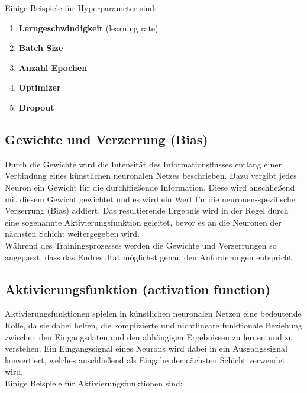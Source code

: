 Einige Beispiele für Hyperparameter sind:

\begin{enumerate}
	\item \textbf{Lerngeschwindigkeit} (learning rate)
	\item \textbf{Batch Size}
	\item \textbf{Anzahl Epochen}
	\item \textbf{Optimizer}
	\item \textbf{Dropout}
\end{enumerate}
	
\subsection{Gewichte und Verzerrung (Bias)}

	Durch die Gewichte wird die Intensität des Informationsflusses entlang einer Verbindung eines künstlichen neuronalen Netzes beschrieben. Dazu vergibt jedes Neuron ein Gewicht für die durchfließende Information. Diese wird anschließend mit diesem Gewicht gewichtet und es wird ein Wert für die neuronen-spezifische Verzerrung (Bias) addiert. Das resultierende Ergebnis wird in der Regel durch eine sogenannte Aktivierungsfunktion geleitet, bevor es an die Neuronen der nächsten Schicht weitergegeben wird. \cite{jaai} \\
	
	Während des Trainingsprozesses werden die Gewichte und Verzerrungen so angepasst, dass das Endresultat möglichst genau den Anforderungen entspricht. \cite{jaai}
	
\subsection{Aktivierungsfunktion (activation function)}

	Aktivierungsfunktionen spielen in künstlichen neuronalen Netzen eine bedeutende Rolle, da sie dabei helfen, die komplizierte und nichtlineare funktionale Beziehung zwischen den Eingangsdaten und den abhängigen Ergebnissen zu lernen und zu verstehen. Ein Eingangssignal eines Neurons wird dabei in ein Ausgangssignal konvertiert, welches anschließend als Eingabe der nächsten Schicht verwendet wird. \cite{ai-united} \\
	
	Einige Beispiele für Aktivierungsfunktionen sind:
	
